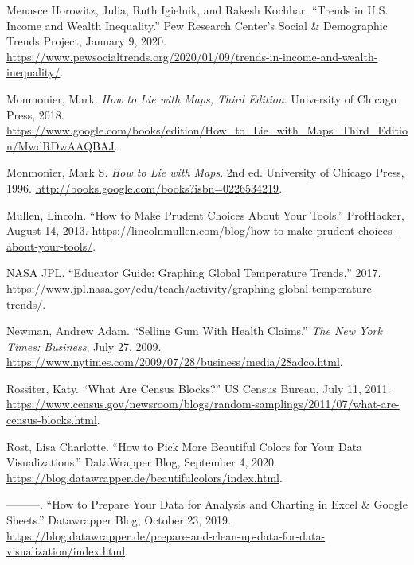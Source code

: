 \documentclass[
  english,
]{book}
\newlength{\cslhangindent}
\newlength{\cslentryspacingunit} %
\newenvironment{CSLReferences}[2] %
 {%
  \setlength{\parindent}{0pt}
  \ifodd #1
  \let\oldpar\par
  \def\par{\hangindent=\cslhangindent\oldpar}
  \fi
  \setlength{\parskip}{#2\cslentryspacingunit}
 }%
 {}
\begin{document}
\begin{CSLReferences}{1}{0}
\leavevmode{}%
Menasce Horowitz, Julia, Ruth Igielnik, and Rakesh Kochhar. {``Trends in {U}.{S}. Income and Wealth Inequality.''} {Pew Research Center's Social \& Demographic Trends Project}, January 9, 2020. \url{https://www.pewsocialtrends.org/2020/01/09/trends-in-income-and-wealth-inequality/}.

\leavevmode{}%
Monmonier, Mark. \emph{How to {Lie} with {Maps}, {Third Edition}}. {University of Chicago Press}, 2018. \url{https://www.google.com/books/edition/How_to_Lie_with_Maps_Third_Edition/MwdRDwAAQBAJ}.

\leavevmode{}%
Monmonier, Mark S. \emph{How to {Lie} with {Maps}}. 2nd ed. {University of Chicago Press}, 1996. \url{http://books.google.com/books?isbn=0226534219}.

\leavevmode{}%
Mullen, Lincoln. {``How to {Make Prudent Choices About Your Tools}.''} {ProfHacker}, August 14, 2013. \url{https://lincolnmullen.com/blog/how-to-make-prudent-choices-about-your-tools/}.

\leavevmode{}%
NASA JPL. {``Educator {Guide}: {Graphing Global Temperature Trends},''} 2017. \url{https://www.jpl.nasa.gov/edu/teach/activity/graphing-global-temperature-trends/}.

\leavevmode{}%
Newman, Andrew Adam. {``Selling {Gum With Health Claims}.''} \emph{The New York Times: Business}, July 27, 2009. \url{https://www.nytimes.com/2009/07/28/business/media/28adco.html}.

\leavevmode{}%
Rossiter, Katy. {``What Are Census Blocks?''} {US Census Bureau}, July 11, 2011. \url{https://www.census.gov/newsroom/blogs/random-samplings/2011/07/what-are-census-blocks.html}.

\leavevmode{}%
Rost, Lisa Charlotte. {``How to {Pick More Beautiful Colors} for {Your Data Visualizations}.''} {DataWrapper Blog}, September 4, 2020. \url{https://blog.datawrapper.de/beautifulcolors/index.html}.

\leavevmode{}%
---------. {``How to {Prepare Your Data} for {Analysis} and {Charting} in {Excel} \& {Google Sheets}.''} {Datawrapper Blog}, October 23, 2019. \url{https://blog.datawrapper.de/prepare-and-clean-up-data-for-data-visualization/index.html}.


\end{CSLReferences}
\end{document}
